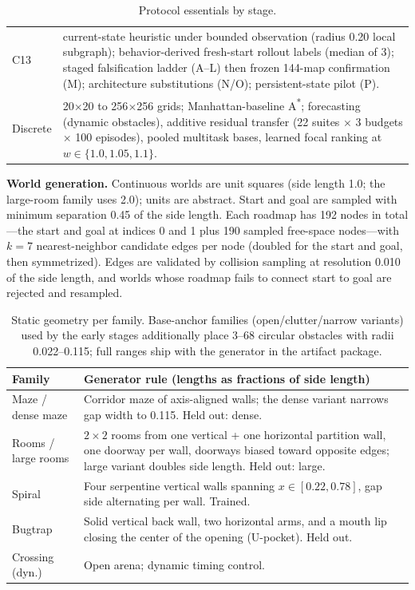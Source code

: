 \documentclass[letterpaper]{article} %
\newcommand{\stage}[1]{\textsc{#1}}
\begin{document}
\begin{table}[t]
\begin{tabular}{@{}lp{14.2cm}@{}}
\stage{C13} & current-state heuristic under bounded observation (radius 0.20 local subgraph); behavior-derived fresh-start rollout labels (median of 3); staged falsification ladder (\stage{A}--\stage{L}) then frozen 144-map confirmation (\stage{M}); architecture substitutions (\stage{N}/\stage{O}); persistent-state pilot (\stage{P}). \\
Discrete & 20$\times$20 to 256$\times$256 grids; Manhattan-baseline A\textsuperscript{*}; forecasting (dynamic obstacles), additive residual transfer (22 suites $\times$ 3 budgets $\times$ 100 episodes), pooled multitask bases, learned focal ranking at $w\in\{1.0,1.05,1.1\}$. \\
\bottomrule
\end{tabular}
\caption{Protocol essentials by stage.}
\label{tab:protocols}
\end{table}

\textbf{World generation.} Continuous worlds are unit squares (side length 1.0; the large-room family uses 2.0); units are abstract. Start and goal are sampled with minimum separation 0.45 of the side length. Each roadmap has 192 nodes in total---the start and goal at indices 0 and 1 plus 190 sampled free-space nodes---with $k{=}7$ nearest-neighbor candidate edges per node (doubled for the start and goal, then symmetrized). Edges are validated by collision sampling at resolution 0.010 of the side length, and worlds whose roadmap fails to connect start to goal are rejected and resampled.

\begin{table}[t]
\centering
\small
\setlength{\tabcolsep}{2.5pt}
\begin{tabular}{@{}lp{5.6cm}@{}}
\toprule
Family & Generator rule (lengths as fractions of side length) \\
\midrule
Maze / dense maze & Corridor maze of axis-aligned walls; the dense variant narrows gap width to 0.115. Held out: dense. \\
Rooms / large rooms & $2{\times}2$ rooms from one vertical + one horizontal partition wall, one doorway per wall, doorways biased toward opposite edges; large variant doubles side length. Held out: large. \\
Spiral & Four serpentine vertical walls spanning $x \in [0.22, 0.78]$, gap side alternating per wall. Trained. \\
Bugtrap & Solid vertical back wall, two horizontal arms, and a mouth lip closing the center of the opening (U-pocket). Held out. \\
Crossing (dyn.) & Open arena; dynamic timing control. \\
\bottomrule
\end{tabular}
\caption{Static geometry per family. Base-anchor families (open/clutter/narrow variants) used by the early stages additionally place 3--68 circular obstacles with radii 0.022--0.115; full ranges ship with the generator in the artifact package.}
\label{tab:envspec}
\end{table}
\end{document}
